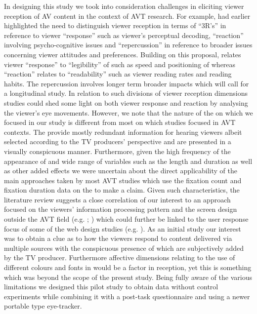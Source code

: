 \documentclass[output=paper]{langsci/langscibook}
\begin{document}
In designing this study we took into consideration challenges in eliciting viewer reception of AV content in the context of AVT research.  For example, \citet{kovacic1995} had earlier highlighted the need to distinguish viewer reception in terms of ``3R's'' in reference to viewer ``response'' such as viewer's perceptual decoding, ``reaction'' involving psycho-cognitive issues and ``repercussion'' in reference to broader issues concerning viewer attitudes and preferences. Building on this proposal, \citet[56--57]{gambier2013} relates viewer ``response'' to ``legibility'' of  such as speed and positioning of  whereas ``reaction'' relates to ``readability'' such as viewer reading rates and reading habits. The repercussion involves longer term broader impacts which will call for a longitudinal study.  In relation to such divisions of viewer reception dimensions  studies could shed some light on both viewer response and reaction by analysing the viewer's eye movements.  However, we note that the nature of the  on which we focused in our study is different from most  on which  studies focused in AVT contexts. The  provide mostly redundant information for hearing viewers albeit selected according to the TV producers' perspective and are presented in a visually conspicuous manner. Furthermore, given the high frequency of the appearance of  and wide range of variables such as the length and duration as well as other added effects we were uncertain about the direct applicability of the main approaches taken by most AVT  studies which use the fixation count and fixation duration data on the  to make a claim.  Given such characteristics, the literature review suggests a close correlation of our interest to an approach focused on the viewers' information processing pattern and the screen design outside the AVT field (e.g. \citealt{josephson2006}; \citealt{Matsukawa2009}) which could further be linked to the user response focus of some of the web design  studies (e.g. \citealt{Nielsen2010}). As an initial study our interest was to obtain a clue as to how the viewers respond to content delivered via multiple sources with the conspicuous presence of  which are subjectively added by the TV producer. Furthermore affective dimensions relating to the use of different colours and fonts in  would be a factor in reception, yet this is something which was beyond the scope of the present study. Being fully aware of the various limitations we designed this pilot study to obtain data without control experiments while combining it with a post-task questionnaire and using a newer portable type eye-tracker. 
\end{document}
